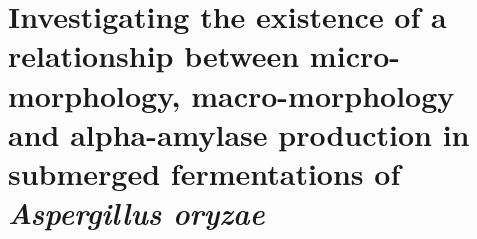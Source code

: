 \documentclass[a4paper,12pt]{report}
\begin{document}
\setcounter{chapter}{5}

\chapter{Investigating the existence of a relationship between micro-morphology, macro-morphology and alpha-amylase production in submerged fermentations of \emph{Aspergillus oryzae}}









\newpage
{}
{}



\end{document}
